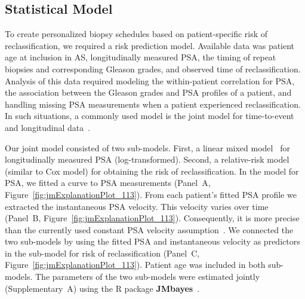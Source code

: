 \subsection{Statistical Model}
To create personalized biopsy schedules based on patient-specific risk of reclassification, we required a risk prediction model. Available data was patient age at inclusion in AS, longitudinally measured PSA, the timing of repeat biopsies and corresponding Gleason grades, and observed time of reclassification. Analysis of this data required modeling the within-patient correlation for PSA, the association between the Gleason grades and PSA profiles of a patient, and handling missing PSA measurements when a patient experienced reclassification. In such situations, a commonly used model is the joint model for time-to-event and longitudinal data~\citep{tomer2019,coley2017prediction,rizopoulos2012joint}.

Our joint model consisted of two sub-models. First, a linear mixed model~\citep{laird1982random} for longitudinally measured PSA (log-transformed). Second, a relative-risk model (similar to Cox model) for obtaining the risk of reclassification. In the model for PSA, we fitted a curve to PSA measurements (Panel~A, Figure~\ref{fig:jmExplanationPlot_113}). From each patient's fitted PSA profile we extracted the instantaneous PSA velocity. This velocity varies over time (Panel~B, Figure~\ref{fig:jmExplanationPlot_113}). Consequently, it is more precise than the currently used constant PSA velocity assumption~\citep{vickers2009psavelocity}. We connected the two sub-models by using the fitted PSA and instantaneous velocity as predictors in the sub-model for risk of reclassification (Panel~C, Figure~\ref{fig:jmExplanationPlot_113}). Patient age was included in both sub-models. The parameters of the two sub-models were estimated jointly (Supplementary~A) using the R package \textbf{JMbayes}~\citep{rizopoulosJMbayes}. 

